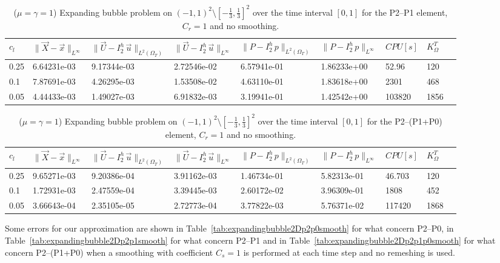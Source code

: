 \documentclass[a4paper,12pt,onecolumn]{article}
\newcommand{\errorXx}{\|\vec{X} - \vec{x}\|_{L^\infty}}
\newcommand{\LerrorUu}[1]{\|\vec U - I^h_{#1}\,\vec u\|_{L^2(\Omega_T)}}
\newcommand{\errorUu}[1]{\|\vec U - I^h_{#1}\,\vec u\|_{L^\infty}}
\newcommand{\errorPp}[1]{\|P - I^h_{#1}\,p\|_{L^\infty}}
\newcommand{\LerrorPp}[1]{\|P - I^h_{#1}\,p\|_{L^2(\Omega_T)}}
\begin{document}
\begin{table}
 \center
 \hspace*{-2cm}
\begin{tabular}{lllllllll}
\hline
$c_l$ & $\errorXx$ & $\LerrorUu2$ & $\errorUu2$ & $\LerrorPp2$ & $\errorPp2$ & $CPU[s]$ & $K_\Omega^T$\\
\hline
0.25 &  6.64231e-03 & 9.17344e-03 & 2.72546e-02 & 6.57941e-01 & 1.86233e+00 & 52.96 & 120\\
0.1 & 7.87691e-03 & 4.26295e-03 & 1.53508e-02 & 4.63110e-01 & 1.83618e+00 & 2301 & 468\\
0.05 & 4.44433e-03 & 1.49027e-03 & 6.91832e-03 & 3.19941e-01 & 1.42542e+00 & 103820 & 1856\\
\hline
\end{tabular}
\hspace*{-2cm}
\caption{($\mu=\gamma=1$) Expanding bubble problem on $(-1,1)^2\setminus[-\frac{1}{3},\frac{1}{3}]^2$ over the time interval $[0,1]$ for the P2--P1 element, $C_r=1$ and no smoothing.}
\label{tab:expandingbubble2Dp2p1remesh}
\end{table}

\begin{table}
 \center
 \hspace*{-2cm}
\begin{tabular}{lllllllll}
\hline
$c_l$ & $\errorXx$ & $\LerrorUu2$ & $\errorUu2$ & $\LerrorPp2$ & $\errorPp2$ & $CPU[s]$ & $K_\Omega^T$\\
\hline
0.25 & 9.65271e-03 & 9.20386e-04 & 3.91162e-03 & 1.46734e-01 & 5.82313e-01 & 46.703 & 120\\
0.1 & 1.72931e-03 & 2.47559e-04 & 3.39445e-03 & 2.60172e-02 & 3.96309e-01 & 1808 & 452\\
0.05 & 3.66643e-04 & 2.35105e-05 & 2.72773e-04 & 3.77822e-03 & 5.76371e-02 & 117420 & 1868\\
\hline
\end{tabular}
\hspace*{-2cm}
\caption{($\mu=\gamma=1$) Expanding bubble problem on $(-1,1)^2\setminus[-\frac{1}{3},\frac{1}{3}]^2$ over the time interval $[0,1]$ for the P2--(P1+P0) element, $C_r=1$ and no smoothing.}
\label{tab:expandingbubble2Dp2p1p0remesh}
\end{table}

Some errors for our approximation are shown in Table~\ref{tab:expandingbubble2Dp2p0smooth} for what concern P2--P0, in Table~\ref{tab:expandingbubble2Dp2p1smooth} for what concern P2--P1 and in Table~\ref{tab:expandingbubble2Dp2p1p0smooth} for what concern P2--(P1+P0) when a smoothing with coefficient $C_s=1$ is performed at each time step and no remeshing is used.
\end{document}
